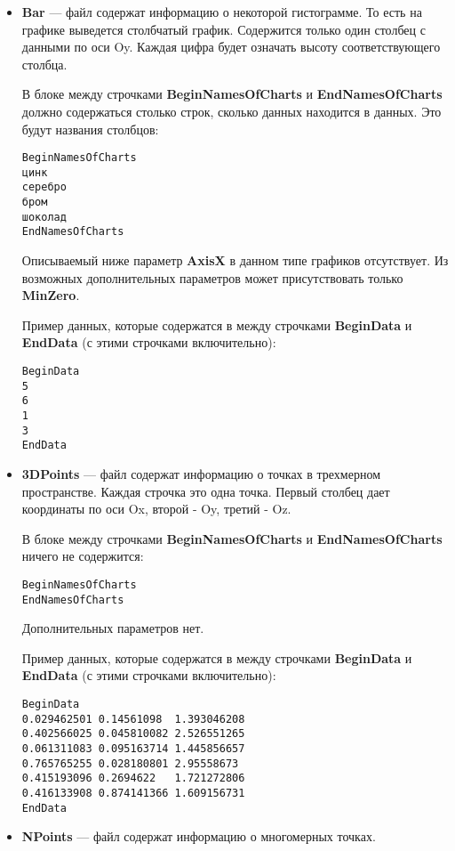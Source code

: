 \documentclass[a4paper,12pt]{article}
\begin{document}
\begin{itemize}
\begin{itemize}
\item \textbf{Bar} --- файл содержат информацию о некоторой гистограмме. То есть на графике выведется столбчатый график. Содержится только один столбец с данными по оси Oy. Каждая цифра будет означать высоту соответствующего столбца.

В блоке между строчками \textbf{BeginNamesOfCharts} и \textbf{EndNamesOfCharts} должно содержаться столько строк, сколько данных находится в данных. Это будут названия столбцов:
\begin{lstlisting}[label=Line033_2,caption=Для Bar ]
BeginNamesOfCharts
цинк
серебро
бром
шоколад
EndNamesOfCharts
\end{lstlisting}

Описываемый ниже параметр \textbf{AxisX} в данном типе графиков отсутствует. Из возможных дополнительных параметров может присутствовать только \textbf{MinZero}.

Пример данных, которые содержатся в между строчками \textbf{BeginData} и \textbf{EndData} (с этими строчками включительно):
\begin{lstlisting}[label=Line033_3,caption=Для Bar ]
BeginData
5
6
1
3
EndData
\end{lstlisting}

\item \textbf{3DPoints} --- файл содержат информацию о точках в трехмерном пространстве. Каждая строчка это одна точка. Первый столбец дает координаты по оси Ox, второй - Oy, третий - Oz.

В блоке между строчками \textbf{BeginNamesOfCharts} и \textbf{EndNamesOfCharts} ничего не содержится:
\begin{lstlisting}[label=Line034_2,caption=Для 3DPoints ]
BeginNamesOfCharts
EndNamesOfCharts
\end{lstlisting}

Дополнительных параметров нет.

Пример данных, которые содержатся в между строчками \textbf{BeginData} и \textbf{EndData} (с этими строчками включительно):
\begin{lstlisting}[label=Line034_3,caption=Для 3DPoints ]
BeginData
0.029462501	0.14561098	1.393046208
0.402566025	0.045810082	2.526551265
0.061311083	0.095163714	1.445856657
0.765765255	0.028180801	2.95558673	
0.415193096	0.2694622	1.721272806
0.416133908	0.874141366	1.609156731
EndData
\end{lstlisting}

\item \textbf{NPoints} --- файл содержат информацию о многомерных точках.


\end{itemize}
\end{itemize}
\end{document}
